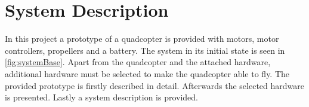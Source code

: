 \chapter{System Description}\label{cha:Systemdescription}
In this project a prototype of a quadcopter is provided with motors, motor controllers, propellers and a battery. The system in its initial state is seen in \autoref{fig:systemBase}. Apart from the quadcopter and the attached hardware, additional hardware must be selected to make the quadcopter able to fly. The provided prototype is firstly described in detail. Afterwards the selected hardware is presented. Lastly a system description is provided.   



%

